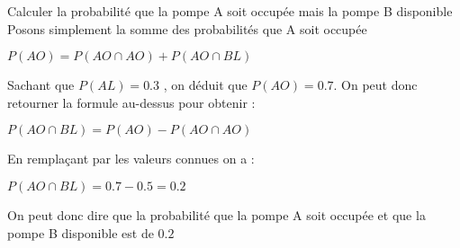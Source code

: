 \begin{exo}
	\begin{subexo}{Calculer la probabilité que la pompe A soit occupée mais la pompe B disponible}
		Posons simplement la somme des probabilités que A soit occupée 
		\begin{center}
			$P(AO) = P(AO \cap AO) + P(AO \cap BL)$
		\end{center}
		Sachant que $P(AL) = 0.3$ , on déduit que $P(AO) = 0.7$. On peut donc retourner la formule au-dessus pour obtenir :
		\begin{center}
			$P(AO \cap BL) = P(AO) - P(AO \cap AO)$
		\end{center}
	En remplaçant par les valeurs connues on a :
	\begin{center}
		$P(AO \cap BL) = 0.7 - 0.5 = 0.2$
	\end{center}
	On peut donc dire que la probabilité que la pompe A soit occupée et que la pompe B disponible est de $0.2$
	\end{subexo}
	\end{exo}
	

